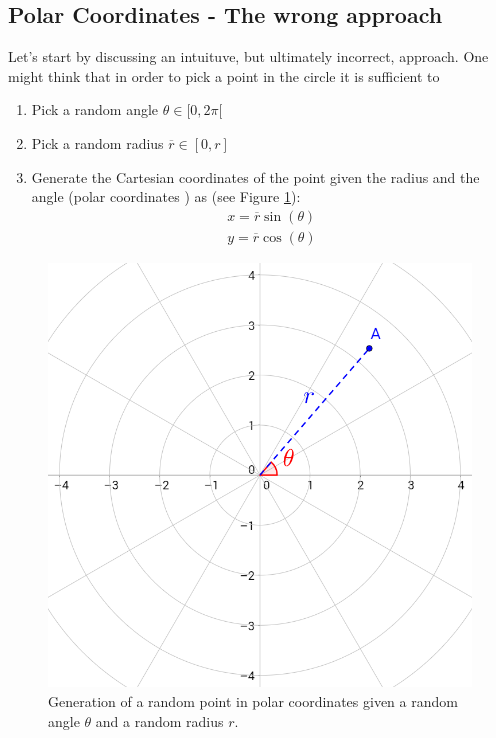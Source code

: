 \subsection{Polar Coordinates - The wrong approach}
\label{random_points_in_circle:sec:buggy}
Let's start by discussing an intuituve, but ultimately incorrect, approach. One might think that in order to pick a point in the circle it is sufficient to 
\begin{enumerate}
	\item Pick a random angle $\theta \in [0, 2\pi[ $
	\item Pick a random radius $\overline{r} \in [0,r]$
	\item Generate the Cartesian coordinates of the point given the radius and the angle (polar coordinates \cite{cit:wiki:polarcoordinates}) as (see Figure \ref{fig:random_points_in_cirle:polar_coordinates}):
	\begin{gather*}
		 x=\overline{r}\sin(\theta) \\
		 y=\overline{r}\cos(\theta) 
	\end{gather*}
\end{enumerate}

\begin{figure}
	\label{fig:random_points_in_cirle:polar_coordinates}
	\centering
	\includegraphics[scale=0.3]{sources/random_points_in_circle/images/polar-coordinate}
	\caption{Generation of a random point in polar coordinates given a random angle $\theta$ and a random radius $r$.}
\end{figure}

